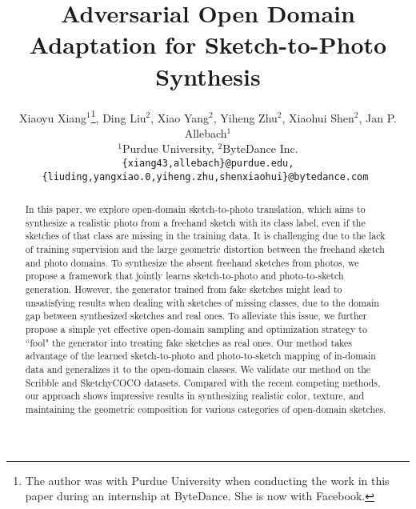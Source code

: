 \documentclass[10pt,twocolumn,letterpaper]{article}
\begin{document}
\title{Adversarial Open Domain Adaptation for Sketch-to-Photo Synthesis}

\author{Xiaoyu Xiang$^1$\thanks{The author was with Purdue University when conducting the work in this paper during an internship at ByteDance. She is now with Facebook.},  Ding Liu$^2$,  Xiao Yang$^2$, Yiheng Zhu$^2$, Xiaohui Shen$^2$, Jan P. Allebach$^1$ \\
$^{1}$Purdue University, $^{2}$ByteDance Inc. \\
 \tt\small \{xiang43,allebach\}@purdue.edu, \\
 \tt\small{\{liuding,yangxiao.0,yiheng.zhu,shenxiaohui\}@bytedance.com}
}

\maketitle



\begin{abstract}
   In this paper, we explore open-domain sketch-to-photo translation, which aims to synthesize a realistic photo from a freehand sketch with its class label, even if the sketches of that class are missing in the training data. It is challenging due to the lack of training supervision and the large geometric distortion between the freehand sketch and photo domains. To synthesize the absent freehand sketches from photos, we propose a framework that jointly learns sketch-to-photo and photo-to-sketch generation. However, the generator trained from fake sketches might lead to unsatisfying results when dealing with sketches of missing classes, due to the domain gap between synthesized sketches and real ones. To alleviate this issue, we further propose a simple yet effective open-domain sampling and optimization strategy to ``fool" the generator into treating fake sketches as real ones. Our method takes advantage of the learned sketch-to-photo and photo-to-sketch mapping of in-domain data and generalizes it to the open-domain classes. We validate our method on the Scribble and SketchyCOCO datasets. Compared with the recent competing methods, our approach shows impressive results in synthesizing realistic color, texture, and maintaining the geometric composition for various categories of open-domain sketches.
\end{abstract}
\end{document}
